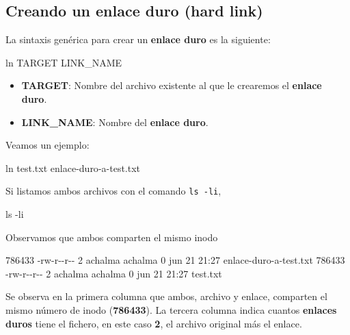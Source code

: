 \documentclass[
  jou,
  floatsintext,
  longtable,
  a4paper,
  nolmodern,
  notxfonts,
  notimes,
  colorlinks=true,linkcolor=blue,citecolor=blue,urlcolor=blue]{apa7}
\newenvironment{Shaded}{\begin{snugshade}}{\end{snugshade}}
\newcommand{\AttributeTok}[1]{\textcolor[rgb]{0.40,0.45,0.13}{#1}}
\newcommand{\ExtensionTok}[1]{\textcolor[rgb]{0.00,0.23,0.31}{#1}}
\newcommand{\FunctionTok}[1]{\textcolor[rgb]{0.28,0.35,0.67}{#1}}
\newcommand{\NormalTok}[1]{\textcolor[rgb]{0.00,0.23,0.31}{#1}}
\providecommand{\tightlist}{%
  \setlength{\itemsep}{0pt}\setlength{\parskip}{0pt}}
\begin{document}
\subsection{Creando un enlace duro (hard
link)}\label{creando-un-enlace-duro-hard-link}

La sintaxis genérica para crear un \textbf{enlace duro} es la siguiente:

\begin{Shaded}
\begin{Highlighting}[]
\FunctionTok{ln}\NormalTok{ TARGET LINK\_NAME}
\end{Highlighting}
\end{Shaded}

\begin{itemize}
\tightlist
\item
  \textbf{TARGET}: Nombre del archivo existente al que le crearemos el
  \textbf{enlace duro}.
\item
  \textbf{LINK\_NAME}: Nombre del \textbf{enlace duro}.
\end{itemize}

Veamos un ejemplo:

\begin{Shaded}
\begin{Highlighting}[]
\FunctionTok{ln}\NormalTok{ test.txt enlace{-}duro{-}a{-}test.txt}
\end{Highlighting}
\end{Shaded}

Si listamos ambos archivos con el comando \texttt{ls\ -li},

\begin{Shaded}
\begin{Highlighting}[]
\FunctionTok{ls} \AttributeTok{{-}li}
\end{Highlighting}
\end{Shaded}

Observamos que ambos comparten el mismo inodo

\begin{Shaded}
\begin{Highlighting}[]
\ExtensionTok{786433} \AttributeTok{{-}rw{-}r{-}{-}r{-}{-}}\NormalTok{ 2 achalma achalma 0 jun 21 21:27 enlace{-}duro{-}a{-}test.txt}
\ExtensionTok{786433} \AttributeTok{{-}rw{-}r{-}{-}r{-}{-}}\NormalTok{ 2 achalma achalma 0 jun 21 21:27 test.txt}
\end{Highlighting}
\end{Shaded}

Se observa en la primera columna que ambos, archivo y enlace, comparten
el mismo número de inodo (\textbf{786433}). La tercera columna indica
cuantos \textbf{enlaces duros} tiene el fichero, en este caso
\textbf{2}, el archivo original más el enlace.
\end{document}
